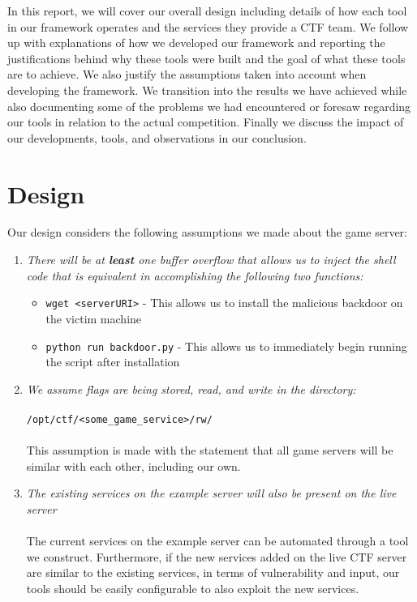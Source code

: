\documentclass[12pt]{report}
\begin{document}
In this report, we will cover our overall design including details of how each tool in our framework operates and the services they provide a CTF team. We follow up with explanations of how we developed our framework and reporting the justifications behind why these tools were built and the goal of what these tools are to achieve. We also justify the assumptions taken into account when developing the framework. We transition into the results we have achieved while also documenting some of the problems we had encountered or foresaw regarding our tools in relation to the actual competition. Finally we discuss the impact of our developments, tools, and observations in our conclusion.

\section*{Design}
Our design considers the following assumptions we made about the game server:

\begin{enumerate}
	\item \textit{There will be at \textbf{least} one buffer overflow that allows us to inject the shell code that is equivalent in accomplishing the following two functions:}
	\begin{itemize}
		\item \texttt{wget <serverURI>} - This allows us to install the malicious backdoor on the victim machine
		\item \texttt{python run backdoor.py} - This allows us to immediately begin running the script after installation
	\end{itemize}
	\item \textit{We assume flags are being stored, read, and write in the directory:} \\\\ \texttt{/opt/ctf/<some\_game\_service>/rw/} \\\\
	This assumption is made with the statement that all game servers will be similar with each other, including our own. 
	\item \textit{The existing services on the example server will also be present on the live server} \\\\ The current services on the example server can be automated through a tool we construct. Furthermore, if the new services added on the live CTF server are similar to the existing services, in terms of vulnerability and input, our tools should be easily configurable to also exploit the new services.
\end{enumerate}
\end{document}
